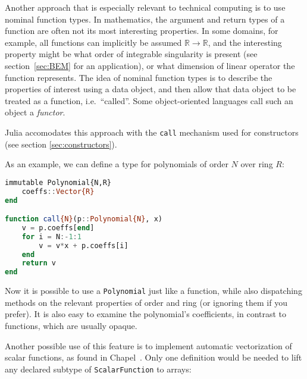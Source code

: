 
Another approach that is especially relevant to technical computing is to use
nominal function types.
In mathematics, the argument and return types of a function are often not
its most interesting properties.
In some domains, for example, all functions can implicitly be assumed
$\mathbb{R}\rightarrow\mathbb{R}$, and the interesting property might be
what order of integrable singularity is present (see section~\ref{sec:BEM} for
an application), or what dimension of linear operator the function represents.
The idea of nominal function types is to describe the properties of interest
using a data object, and then allow that data object to be treated as a
function, i.e.\ ``called''. Some object-oriented languages call such an object
a \emph{functor}.

Julia accomodates this approach with the \texttt{call} mechanism used for
constructors (see section \ref{sec:constructors}).

As an example, we can define a type for polynomials of order $N$ over ring
$R$:

\begin{singlespace}
\begin{lstlisting}[language=julia]
immutable Polynomial{N,R}
    coeffs::Vector{R}
end

function call{N}(p::Polynomial{N}, x)
    v = p.coeffs[end]
    for i = N:-1:1
        v = v*x + p.coeffs[i]
    end
    return v
end
\end{lstlisting}
\end{singlespace}

\noindent
Now it is possible to use a \texttt{Polynomial} just like a function, while
also dispatching methods on the relevant properties of order and ring
(or ignoring them if you prefer).
It is also easy to examine the polynomial's coefficients, in contrast to
functions, which are usually opaque.


Another possible use of this feature is to implement automatic vectorization
of scalar functions, as found in Chapel~\cite{chamberlain2007parallel}.
Only one definition would be needed to lift any declared subtype of
\texttt{ScalarFunction} to arrays:


